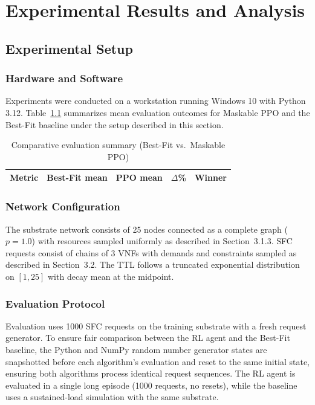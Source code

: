 \chapter{Experimental Results and Analysis}

\section{Experimental Setup}

\subsection{Hardware and Software}

Experiments were conducted on a workstation running Windows 10 with Python 3.12. Table~\ref{tab:eval_summary} summarizes mean evaluation outcomes for Maskable PPO and the Best-Fit baseline under the setup described in this section.

\begin{table}[!ht]
\centering
\caption{Comparative evaluation summary (Best-Fit vs.\ Maskable PPO)}
\label{tab:eval_summary}
\begin{tabularx}{\textwidth}{X r r r l}
\hline
\textbf{Metric} & \textbf{Best-Fit mean} & \textbf{PPO mean} & \textbf{$\Delta$\%} & \textbf{Winner} \\ \hline

\hline
\end{tabularx}
\end{table}

\subsection{Network Configuration}

The substrate network consists of 25 nodes connected as a complete graph ($p = 1.0$) with resources sampled uniformly as described in Section~3.1.3. SFC requests consist of chains of 3 VNFs with demands and constraints sampled as described in Section~3.2. The TTL follows a truncated exponential distribution on $[1, 25]$ with decay mean at the midpoint.

\subsection{Evaluation Protocol}

Evaluation uses 1000 SFC requests on the training substrate with a fresh request generator. To ensure fair comparison between the RL agent and the Best-Fit baseline, the Python and NumPy random number generator states are snapshotted before each algorithm's evaluation and reset to the same initial state, ensuring both algorithms process identical request sequences. The RL agent is evaluated in a single long episode (1000 requests, no resets), while the baseline uses a sustained-load simulation with the same substrate.

